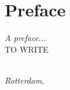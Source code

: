 \chapter*{Preface}

\emph{A preface...}\\
TO WRITE

\begin{flushright}
{\makeatletter\itshape
    \@author \\
    Rotterdam, \monthname{} \the\year{}
\makeatother}
\end{flushright}
